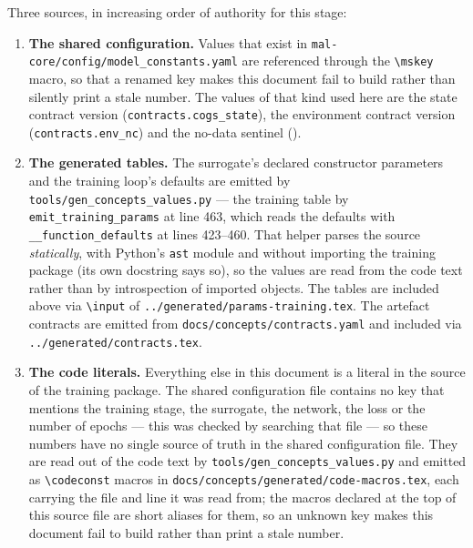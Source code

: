 \documentclass[11pt,a4paper]{article}
\newcommand{\code}[1]{\texttt{#1}}
\newcommand{\codex}[1]{\texttt{#1}}
\begin{document}
Three sources, in increasing order of authority for this stage:

\begin{enumerate}
\item \textbf{The shared configuration.} Values that exist in
      \codex{mal-core/\allowbreak{}config/\allowbreak{}model\_\allowbreak{}constants.yaml} are referenced through the
      \code{\textbackslash mskey} macro, so that a renamed key makes this
      document fail to build rather than silently print a stale number. The
      values of that kind used here are the state contract version
      (\codex{contracts.cogs\_\allowbreak{}state}), the environment contract version
      (\codex{contracts.env\_\allowbreak{}nc}) and the no-data sentinel
      ().
\item \textbf{The generated tables.} The surrogate's declared constructor
      parameters and the training loop's defaults are emitted by
      \codex{tools/\allowbreak{}gen\_\allowbreak{}concepts\_\allowbreak{}values.py} --- the training table by
      \codex{emit\_\allowbreak{}training\_\allowbreak{}params} at line 463, which reads the defaults with
      \codex{\_\_function\_\allowbreak{}defaults} at lines 423--460. That helper parses the
      source \emph{statically}, with Python's \codex{ast} module and without
      importing the training package (its own docstring says so), so the
      values are read from the code text rather than by introspection of
      imported objects. The tables are included above via
      \codex{\textbackslash input} of
      \codex{../\allowbreak{}generated/\allowbreak{}params-training.tex}. The artefact contracts are
      emitted from \codex{docs/\allowbreak{}concepts/\allowbreak{}contracts.yaml} and included via
      \codex{../\allowbreak{}generated/\allowbreak{}contracts.tex}.
\item \textbf{The code literals.} Everything else in this document is a
      literal in the source of the training package. The shared configuration
      file contains no key that mentions the training stage, the surrogate,
      the network, the loss or the number of epochs --- this was checked by
      searching that file --- so these numbers have no single source of truth
      in the shared configuration file. They are read out of the code text by
      \codex{tools/\allowbreak{}gen\_\allowbreak{}concepts\_\allowbreak{}values.py} and emitted as
      \codex{\textbackslash codeconst} macros in
      \codex{docs/\allowbreak{}concepts/\allowbreak{}generated/\allowbreak{}code-macros.tex}, each carrying the
      file and line it was read from; the macros declared at the top of this
      source file are short aliases for them, so an unknown key makes this
      document fail to build rather than print a stale number.
\end{enumerate}
\end{document}
